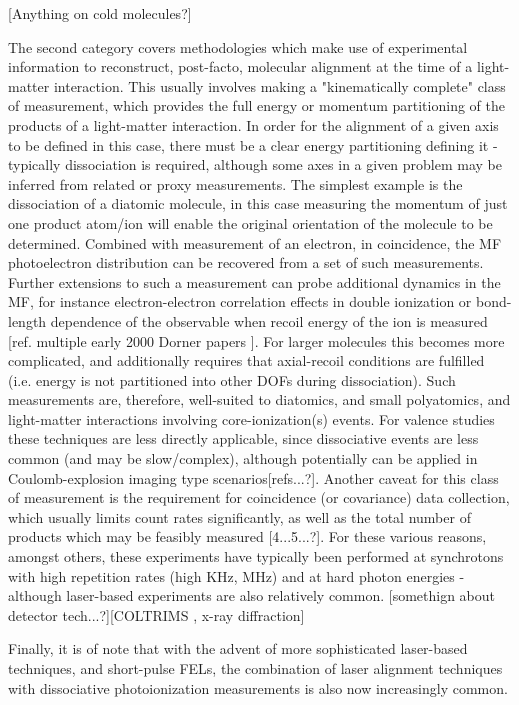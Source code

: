 [Anything on cold molecules?]

The second category covers methodologies which make use of experimental information to reconstruct, post-facto, molecular alignment at the time of a light-matter interaction. This usually involves making a "kinematically complete" class of measurement, which provides the full energy or momentum partitioning of the products of a light-matter interaction. In order for the alignment of a given axis to be defined in this case, there must be a clear energy partitioning defining it - typically dissociation is required, although some axes in a given problem may be inferred from related or proxy measurements. The simplest example is the dissociation of a diatomic molecule, in this case measuring the momentum of just one product atom/ion will enable the original orientation of the molecule to be determined. Combined with measurement of an electron, in coincidence, the MF photoelectron distribution can be recovered from a set of such measurements. Further extensions to such a measurement can probe additional dynamics in the MF, for instance electron-electron correlation effects in double ionization or bond-length dependence of the observable when recoil energy of the ion is measured [ref. multiple early 2000 Dorner papers ]. For larger molecules this becomes more complicated, and additionally requires that axial-recoil conditions are fulfilled (i.e. energy is not partitioned into other DOFs during dissociation). Such measurements are, therefore, well-suited to diatomics, and small polyatomics, and light-matter interactions involving core-ionization(s) events. For valence studies these techniques are less directly applicable, since dissociative events are less common (and may be slow/complex), although potentially can be applied in Coulomb-explosion imaging type scenarios[refs...?]. Another caveat for this class of measurement is the requirement for coincidence (or covariance) data collection, which usually limits count rates significantly, as well as the total number of products which may be feasibly measured [4...5...?]. For these various reasons, amongst others, these experiments have typically been performed at synchrotons with high repetition rates (high KHz, MHz) and at hard photon energies - although laser-based experiments are also relatively common. [somethign about detector tech...?][COLTRIMS \cite{Dorner1997a,Dorner2000}, x-ray diffraction] 

Finally, it is of note that with the advent of more sophisticated laser-based techniques, and short-pulse FELs, the combination of laser alignment techniques with dissociative photoionization measurements is also now increasingly common.

